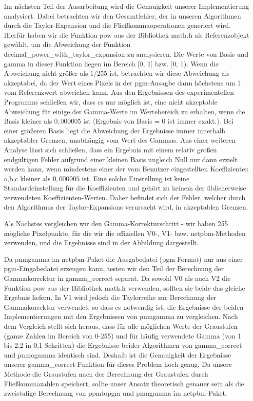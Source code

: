 \documentclass[course=erap]{aspdoc}
\begin{document}
\par
Im nächsten Teil der Ausarbeitung wird die Genauigkeit unserer Implementierung analysiert. Dabei betrachten wir den Gesamtfehler, der in unseren Algorithmen durch die Taylor-Expansion und die Fließkommaoperationen generiert wird. Hierfür haben wir die Funktion pow aus der Bibliothek math.h als Referenzobjekt gewählt, um die Abweichung der Funktion decimal\_power\_with\_taylor\_expansion zu analysieren. Die Werte von Basis und gamma in dieser Funktion liegen im Bereich [0, 1] bzw. [0, 1). Wenn die Abweichung nicht größer als $1/255$ ist, betrachten wir diese Abweichung als akzeptabel, da der Wert eines Pixels in der pgm-Ausagbe dann höchstens um 1 vom Referenzwert abweichen kann. Aus den Ergebnissen des experimentellen Programms schließen wir, dass es nur möglich ist, eine nicht akzeptable Abweichung für einige der Gamma-Werte im Wertebereich zu erhalten, wenn die Basis kleiner als $0,000005$ ist (Ergebnis von Basis = 0 ist immer exakt.). Bei einer größeren Basis liegt die Abweichung der Ergebnisse immer innerhalb akzeptabler Grenzen, unabhängig vom Wert des Gammas. Aus einer weiteren Analyse lässt sich schließen, dass ein Ergebnis mit einem relativ großen endgültigen Fehler aufgrund einer kleinen Basis ungleich Null nur dann erzielt werden kann, wenn mindestens einer der vom Benutzer eingestellten Koeffizienten a,b,c kleiner als $0,000005$ ist. Eine solche Einstellung ist keine Standardeinstellung für die Koeffizienten und gehört zu keinem der üblicherweise verwendeten Koeffizienten-Werten. Daher befindet sich der Fehler, welcher durch den Algorithmus der Taylor-Expansions verursacht wird, in akzeptablen Grenzen.

\par
Als Nächstes vergleichen wir den Gamma-Korrekturschritt - wir haben 255 mögliche Pixelpunkte, für die wir die offiziellen V0-, V1- bzw. netpbm-Methoden verwenden, und die Ergebnisse sind in der Abbildung dargestellt.

\par
Da pnmgamma im netpbm-Paket die Ausgabedatei (pgm-Format) nur aus einer pgm-Eingabedatei erzeugen kann, testen wir den Teil der Berechnung der Gammakorrektur in gamma\_correct separat. Da sowohl V0 als auch V2 die Funktion pow aus der Bibliothek math.h verwenden, sollten sie beide das gleiche Ergebnis liefern. In V1 wird jedoch die Taylorreihe zur Berechnung der Gammakorrektur verwendet, so dass es notwendig ist, die Ergebnisse der beiden Implementierungen mit den Ergebnissen von pnmgamma zu vergleichen. Nach dem Vergleich stellt sich heraus, dass für alle möglichen Werte der Graustufen (ganze Zahlen im Bereich von 0-255) und für häufig verwendete Gamma (von 1 bis 2,2 in 0,1-Schritten) die Ergebnisse beider Algorithmen von gamma\_correct und pnmogamma identisch sind. Deshalb ist die Genauigkeit der Ergebnisse unserer gamma\_correct-Funktion für dieses Problem hoch genug. Da unsere Methode die Graustufen nach der Berechnung der Graustufen durch Fließkommazahlen speichert, sollte unser Ansatz theoretisch genauer sein als die zweistufige Berechnung von ppmtopgm und pnmgamma im netpbm-Paket.
\end{document}
